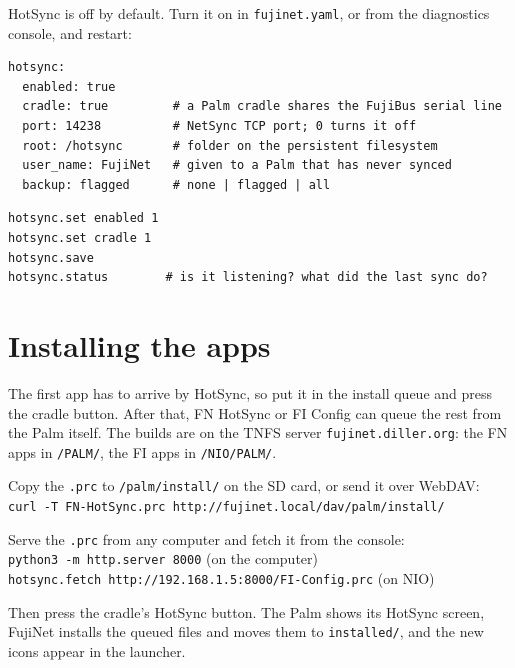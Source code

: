\documentclass[11pt,letterpaper,openany]{book}
\begin{document}
HotSync is off by default. Turn it on in \texttt{fujinet.yaml}, or from the
diagnostics console, and restart:

\begin{codebox}
\begin{verbatim}
hotsync:
  enabled: true
  cradle: true         # a Palm cradle shares the FujiBus serial line
  port: 14238          # NetSync TCP port; 0 turns it off
  root: /hotsync       # folder on the persistent filesystem
  user_name: FujiNet   # given to a Palm that has never synced
  backup: flagged      # none | flagged | all
\end{verbatim}
\end{codebox}

\begin{codebox}
\begin{verbatim}
hotsync.set enabled 1
hotsync.set cradle 1
hotsync.save
hotsync.status        # is it listening? what did the last sync do?
\end{verbatim}
\end{codebox}

\section{Installing the apps}

The first app has to arrive by HotSync, so put it in the install queue and
press the cradle button. After that, \textsf{FN HotSync} or \textsf{FI
Config} can queue the rest from the Palm itself. The builds are on the TNFS
server \texttt{fujinet.diller.org}: the FN apps in \texttt{/PALM/}, the FI apps
in \texttt{/NIO/PALM/}.

\begin{description}[font=\sffamily\bfseries,leftmargin=0pt]
  \item[Classic] Copy the \texttt{.prc} to \texttt{/palm/install/} on the SD
    card, or send it over WebDAV:\\
    \texttt{curl -T FN-HotSync.prc http://fujinet.local/dav/palm/install/}
  \item[NIO] Serve the \texttt{.prc} from any computer and fetch it from the
    console:\\
    \texttt{python3 -m http.server 8000} \quad (on the computer)\\
    \texttt{hotsync.fetch http://192.168.1.5:8000/FI-Config.prc} \quad (on NIO)
\end{description}

Then press the cradle's HotSync button. The Palm shows its HotSync screen,
FujiNet installs the queued files and moves them to \texttt{installed/}, and
the new icons appear in the launcher.
\end{document}
